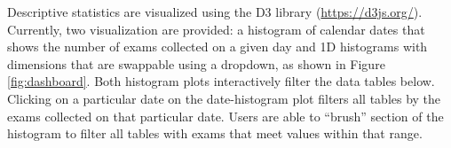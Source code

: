 Descriptive statistics are visualized using the D3 library (\href{https://d3js.org/}{https://d3js.org/}). Currently, two visualization are provided: a histogram of calendar dates that shows the number of exams collected on a given day and 1D histograms with dimensions that are swappable using a dropdown, as shown in Figure \ref{fig:dashboard}. Both histogram plots interactively filter the data tables below. Clicking on a particular date on the date-histogram plot filters all tables by the exams collected on that particular date. Users are able to ``brush'' section of the histogram to filter all tables with exams that meet values within that range.  